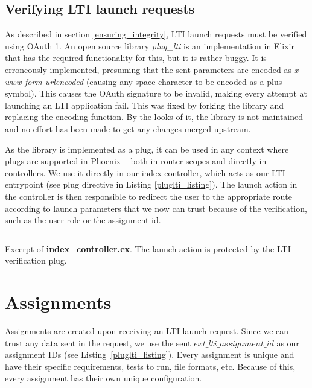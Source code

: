 \subsection{Verifying LTI launch requests}

As described in section \ref{ensuring_integrity}, LTI launch requests must be verified using OAuth 1. An open source library \emph{plug\_lti} is an implementation in Elixir that has the required functionality for this, but it is rather buggy. It is erroneously implemented, presuming that the sent parameters are encoded as \emph{x-www-form-urlencoded} (causing any space character to be encoded as a plus symbol). This causes the OAuth signature to be invalid, making every attempt at launching an LTI application fail. This was fixed by forking the library and replacing the encoding function. By the looks of it, the library is not maintained and no effort has been made to get any changes merged upstream.

As the library is implemented as a plug, it can be used in any context where plugs are supported in Phoenix -- both in router scopes and directly in controllers. We use it directly in our index controller, which acts as our LTI entrypoint (see plug directive in Listing \ref{pluglti_listing}). The launch action in the controller is then responsible to redirect the user to the appropriate route according to launch parameters that we now can trust because of the verification, such as the user role or the assignment id.

\begin{listing}
    \inputminted[firstline=8,lastline=27]{elixir}{code/server/lib/thesis_web/controllers/index_controller.ex}
    \caption{Excerpt of \textbf{index\_controller.ex}. The launch action is protected by the LTI verification plug.}
    \label{pluglti_listing}
\end{listing}

\section{Assignments}

Assignments are created upon receiving an LTI launch request. Since we can trust any data sent in the request, we use the sent $ext\_lti\_assignment\_id$ as our assignment IDs (see Listing~\ref{pluglti_listing}). Every assignment is unique and have their specific requirements, tests to run, file formats, etc. Because of this, every assignment has their own unique configuration.

